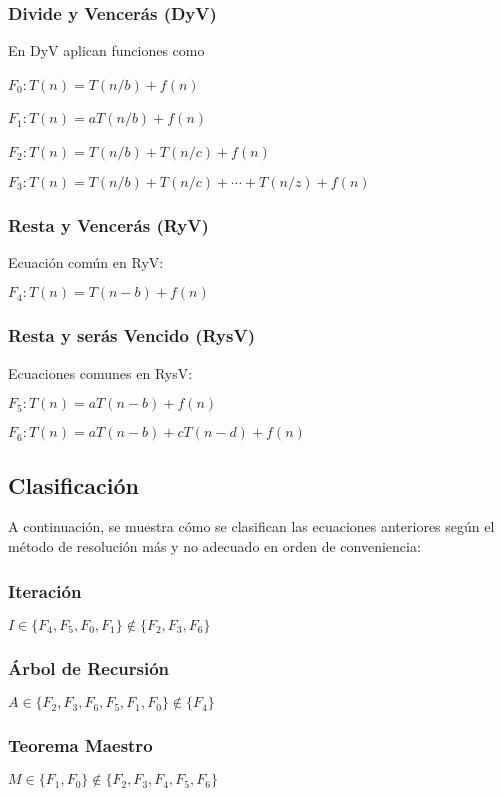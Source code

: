 \documentclass[tikz,11pt,fleqn]{book} %
\begin{document}
\subsubsection{Divide y Vencerás (DyV)}
En DyV aplican funciones como

\( F_0 : T(n) = T(n/b) + f(n) \) \

\( F_1 : T(n) = aT(n/b) + f(n) \) \

\( F_2 : T(n) = T(n/b) + T(n/c) + f(n) \) \

\( F_3 : T(n) = T(n/b) + T(n/c) + \cdots + T(n/z) + f(n) \)

\subsubsection{Resta y Vencerás (RyV)}
Ecuación común en RyV:

\( F_4 : T(n) = T(n-b) + f(n) \)

\subsubsection{Resta y serás Vencido (RysV)}
Ecuaciones comunes en RysV:

\( F_5 : T(n) = aT(n-b) + f(n) \)

\( F_6 : T(n) = aT(n-b) + cT(n-d) + f(n) \)

\subsection{Clasificación}
A continuación, se muestra cómo se clasifican las ecuaciones anteriores según el método de resolución más y no adecuado en orden de conveniencia:

\subsubsection{Iteración}
\(  I\in\{F_4, F_5, F_0, F_1\} \not\in\{F_2, F_3, F_6\} \)

\subsubsection{Árbol de Recursión}
\(  A\in\{F_2, F_3, F_6, F_5, F_1, F_0\}\not\in\{F_4\} \)

\subsubsection{Teorema Maestro}
\(  M\in\{F_1, F_0\} \not\in\{F_2, F_3, F_4, F_5, F_6\} \)
\end{document}

